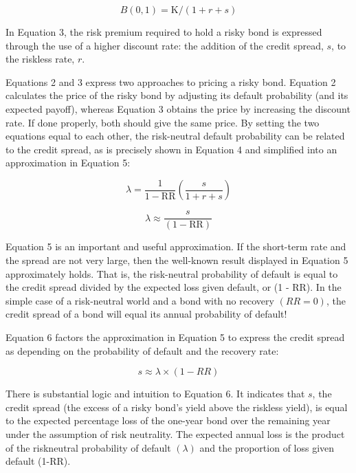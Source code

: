\documentclass[11pt]{article}
\begin{document}
\begin{equation*}
B(0,1)=\mathrm{K} /(1+r+s) \tag{3}
\end{equation*}


In Equation 3, the risk premium required to hold a risky bond is expressed through the use of a higher discount rate: the addition of the credit spread, $s$, to the riskless rate, $r$.

Equations 2 and 3 express two approaches to pricing a risky bond. Equation 2 calculates the price of the risky bond by adjusting its default probability (and its expected payoff), whereas Equation 3 obtains the price by increasing the discount rate. If done properly, both should give the same price. By setting the two equations equal to each other, the risk-neutral default probability can be related to the credit spread, as is precisely shown in Equation 4 and simplified into an approximation in Equation 5:


\begin{equation*}
\lambda=\frac{1}{1-\mathrm{RR}}\left(\frac{s}{1+r+s}\right) \tag{4}
\end{equation*}



\begin{equation*}
\lambda \approx \frac{s}{(1-\mathrm{RR})} \tag{5}
\end{equation*}


Equation 5 is an important and useful approximation. If the short-term rate and the spread are not very large, then the well-known result displayed in Equation 5 approximately holds. That is, the risk-neutral probability of default is equal to the credit spread divided by the expected loss given default, or (1 - RR). In the simple case of a risk-neutral world and a bond with no recovery $(R R=0)$, the credit spread of a bond will equal its annual probability of default!

Equation 6 factors the approximation in Equation 5 to express the credit spread as depending on the probability of default and the recovery rate:


\begin{equation*}
s \approx \lambda \times(1-R R) \tag{6}
\end{equation*}


There is substantial logic and intuition to Equation 6. It indicates that $s$, the credit spread (the excess of a risky bond's yield above the riskless yield), is equal to the expected percentage loss of the one-year bond over the remaining year under the assumption of risk neutrality. The expected annual loss is the product of the riskneutral probability of default $(\lambda)$ and the proportion of loss given default (1-RR).
\end{document}

